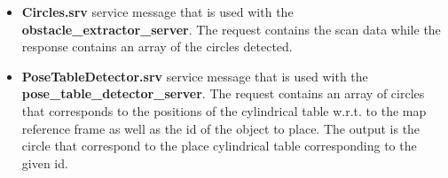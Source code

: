 \begin{itemize}
     \item \textbf{Circles.srv} service message that is used with the \textbf{obstacle\_extractor\_server}. The request contains the scan data while the response contains an array of the circles detected.
     \item \textbf{PoseTableDetector.srv} service message that is used with the \textbf{pose\_table\_detector\_server}. The request contains an array of circles that corresponds to the positions of the cylindrical table w.r.t. to the map reference frame as well as the id of the object to place. The output is the circle that correspond to the place cylindrical table corresponding to the given id.
\end{itemize}
